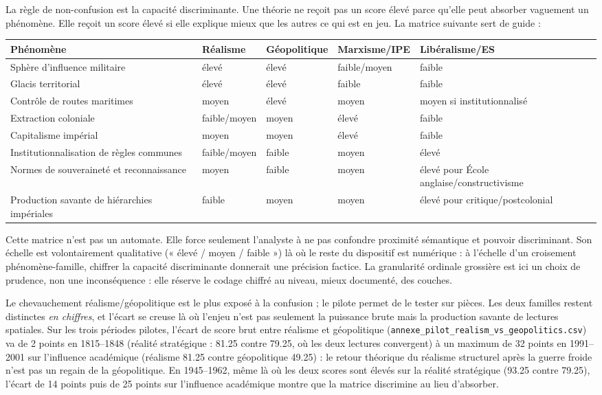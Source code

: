 \documentclass[11pt,a4paper]{article}
\begin{document}
La règle de non-confusion est la capacité discriminante. Une théorie ne reçoit pas un score élevé parce qu'elle peut absorber vaguement un phénomène. Elle reçoit un score élevé si elle explique mieux que les autres ce qui est en jeu. La matrice suivante sert de guide :

\begin{center}
\begin{tabular}{p{4.8cm}p{2cm}p{2.3cm}p{2.3cm}p{2.2cm}}
\hline
Phénomène & Réalisme & Géopolitique & Marxisme/IPE & Libéralisme/ES \\
\hline
Sphère d'influence militaire & élevé & élevé & faible/moyen & faible \\
Glacis territorial & élevé & élevé & faible & faible \\
Contrôle de routes maritimes & moyen & élevé & moyen & moyen si institutionnalisé \\
Extraction coloniale & faible/moyen & moyen & élevé & faible \\
Capitalisme impérial & moyen & moyen & élevé & faible \\
Institutionnalisation de règles communes & faible/moyen & faible & moyen & élevé \\
Normes de souveraineté et reconnaissance & moyen & faible & moyen & élevé pour École anglaise/constructivisme \\
Production savante de hiérarchies impériales & faible & moyen & moyen & élevé pour critique/postcolonial \\
\hline
\end{tabular}
\end{center}

Cette matrice n'est pas un automate. Elle force seulement l'analyste à ne pas confondre proximité sémantique et pouvoir discriminant. Son échelle est volontairement qualitative (« élevé / moyen / faible ») là où le reste du dispositif est numérique : à l'échelle d'un croisement phénomène-famille, chiffrer la capacité discriminante donnerait une précision factice. La granularité ordinale grossière est ici un choix de prudence, non une inconséquence : elle réserve le codage chiffré au niveau, mieux documenté, des couches.

Le chevauchement réalisme/géopolitique est le plus exposé à la confusion ; le pilote permet de le tester sur pièces. Les deux familles restent distinctes \emph{en chiffres}, et l'écart se creuse là où l'enjeu n'est pas seulement la puissance brute mais la production savante de lectures spatiales. Sur les trois périodes pilotes, l'écart de score brut entre réalisme et géopolitique (\texttt{annexe\_pilot\_realism\_vs\_geopolitics.csv}) va de 2 points en 1815--1848 (réalité stratégique : 81.25 contre 79.25, où les deux lectures convergent) à un maximum de 32 points en 1991--2001 sur l'influence académique (réalisme 81.25 contre géopolitique 49.25) : le retour théorique du réalisme structurel après la guerre froide n'est pas un regain de la géopolitique. En 1945--1962, même là où les deux scores sont élevés sur la réalité stratégique (93.25 contre 79.25), l'écart de 14 points puis de 25 points sur l'influence académique montre que la matrice discrimine au lieu d'absorber.
\end{document}
